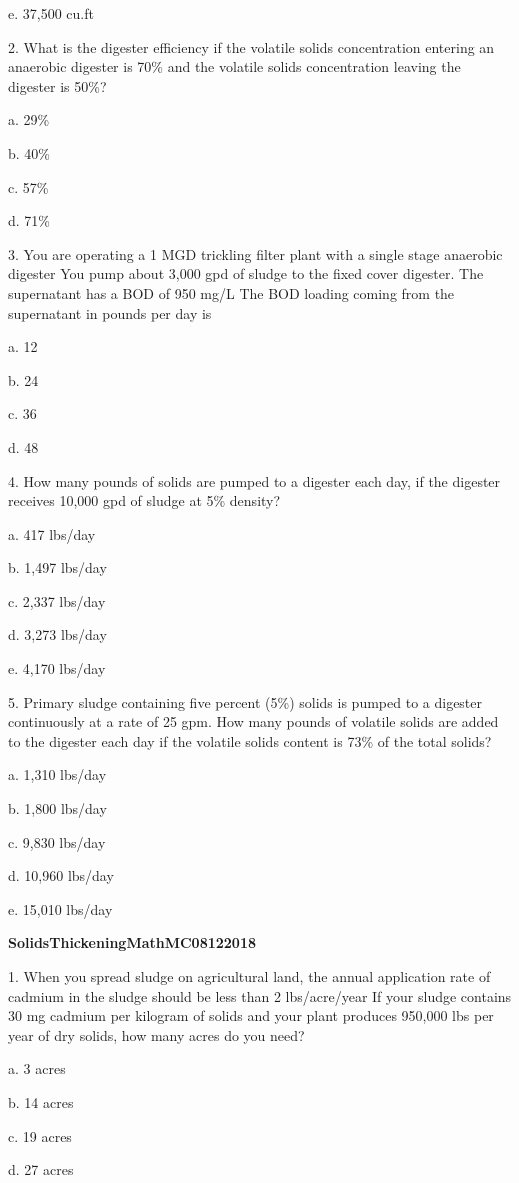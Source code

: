 \documentclass{article}
\begin{document}
e. 37,500 cu.ft 


2. What is the digester efficiency if the volatile solids concentration entering an anaerobic digester is 70\% and the volatile solids concentration leaving the digester is 50\%? 

a. 29\% 

b. 40\% 

c. 57\% 

d. 71\% 


3. You are operating a 1 MGD trickling filter plant with a single stage anaerobic digester You pump about 3,000 gpd of sludge to the fixed cover digester.  The supernatant has a BOD of 950 mg/L The BOD loading coming from the supernatant in pounds per day is 

a. 12 

b. 24 

c. 36 

d. 48 


4. How many pounds of solids are pumped to a digester each day, if the digester receives 10,000 gpd of sludge at 5\% density? 

a. 417 lbs/day 

b. 1,497 lbs/day 

c. 2,337 lbs/day 

d. 3,273 lbs/day 

e. 4,170 lbs/day 


5. Primary sludge containing five percent (5\%) solids is pumped to a digester continuously at a rate of 25 gpm. How many pounds of volatile solids are added to the digester each day if the volatile solids content is 73\% of the total solids? 

a. 1,310 lbs/day 

b. 1,800 lbs/day 

c. 9,830 lbs/day 

d. 10,960 lbs/day 

e. 15,010 lbs/day 


\textbf{SolidsThickeningMathMC08122018}

1. When you spread sludge on agricultural land, the annual application rate of cadmium in the sludge should be less than 2 lbs/acre/year If your sludge contains 30 mg cadmium per kilogram of solids and your plant produces 950,000 lbs per year of dry solids, how many acres do you need? 

a. 3 acres 

b. 14 acres 

c. 19 acres 

d. 27 acres 
\end{document}
